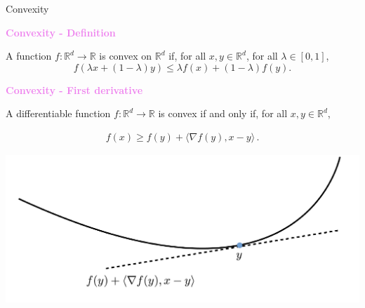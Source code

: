\documentclass[9pt]{beamer}
\newcommand\R{\mathds{R}}
\begin{document}
\begin{frame}{Convexity}

\textbf{\textcolor{violet}{Convexity - Definition}}

A function $f : \R^d \to \R$ is \alert{convex} on $\R^d$ if, for all $x, y \in \R^d$, for all $\lambda \in [0,1]$,
$$
f(\lambda x + (1- \lambda) y ) \leq \lambda f(x) + (1 - \lambda) f(y).
$$	

\textbf{\textcolor{violet}{Convexity - First derivative}}
		
A \alert{differentiable function $f : \R^d \to \R$} is convex if and only if, for all $x,y\in\R^d$,

\begin{align*}
f(x) \geqslant f(y) + \langle \nabla f (y), x-y \rangle\,. 
\end{align*}
	
\vspace{0.4cm}
	
\begin{center}
\includegraphics[scale=0.5]{./picture_convexity2}
\end{center}
\end{frame}
\end{document}
